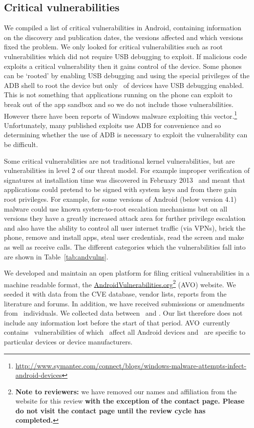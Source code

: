 \documentclass{llncs}
\newcommand{\avo}{AVO}
\begin{document}
\subsection{Critical vulnerabilities}
We compiled a list of critical vulnerabilities in Android, containing information on the discovery and publication dates, the versions affected and which versions fixed the problem.
We only looked for critical vulnerabilities such as root vulnerabilities which did not require USB debugging to exploit.
If malicious code exploits a critical vulnerability then it gains control of the device.
Some phones can be `rooted' by enabling USB debugging and using the special privileges of the ADB shell to root the device but only \daAdbEnabledPerc\ of devices have USB debugging enabled.
This is not something that applications running on the phone can exploit to break out of the app sandbox and so we do not include those vulnerabilities.
However there have been reports of Windows malware exploiting this vector.\footnote{\url{http://www.symantec.com/connect/blogs/windows-malware-attempts-infect-android-devices}}
Unfortunately, many published exploits use ADB for convenience and so determining whether the use of ADB is necessary to exploit the vulnerability can be difficult.

Some critical vulnerabilities are not traditional kernel vulnerabilities, but are vulnerabilities in level 2 of our threat model. For example improper verification of signatures at installation time was discovered in February 2013~\cite{Forristal2013} and meant that applications could pretend to be signed with system keys and from there gain root privileges. For example, for some versions of Android (below version 4.1) malware could use known system-to-root escalation mechanisms but on all versions they have a greatly increased attack area for further privilege escalation and also have the ability to control all user internet traffic (via VPNs), brick the phone, remove and install apps, steal user credentials, read the screen and make as well as receive calls.
The different categories which the vulnerabilities fall into are shown in Table~\ref{tab:andvulns}.
\avoTabAndVulns

We developed and maintain an open platform for filing critical vulnerabilities in a machine readable format, the \href{http://androidvulnerabilities.org/}{AndroidVulnerabilities.org}\footnote{\textbf{Note to reviewers:} we have removed our names and affiliation from the website for this review \textbf{with the exception of the contact page. Please do not visit the contact page until the review cycle has completed.}\vspace{-4em}} (\avo) website.
We seeded it with data from the CVE database, vendor lists, reports from the literature and forums.
In addition, we have received submissions or amendments from \avoNumSubmitters\ individuals.
We collected data between \avoStartDate\ and \avoEndDate.
Our list therefore does not include any information lost before the start of that period.
\avo\ currently contains \avoNumVulnerabilities\ vulnerabilities of which \avoNumVulnAllAndroid\ affect all Android devices and \avoNumVulnSpecific\ are specific to particular devices or device manufacturers.
\end{document}
